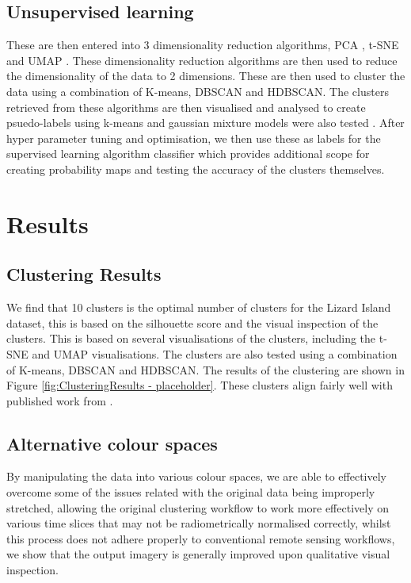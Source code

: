 \documentclass[journal,article,submit,pdftex,moreauthors]{Definitions/mdpi}
\begin{document}
\subsection*{Unsupervised learning}
These are then entered into 3 dimensionality reduction algorithms, PCA \cite{pearson1901}, t-SNE \cite{van2008visualizing} and UMAP \cite{mcinnes2018umap}. These dimensionality reduction algorithms are then used to reduce the dimensionality of the data to 2 dimensions. These are then used to cluster the data using a combination of K-means, DBSCAN and HDBSCAN. The clusters retrieved from these algorithms 
are then visualised and analysed to create psuedo-labels using k-means \cite{macqueen1967some} and gaussian mixture models were also tested \cite{rasmussen1999infinite}. After hyper parameter tuning and optimisation, we then use these as labels for the supervised learning algorithm classifier which provides
additional scope for creating probability maps and testing the accuracy of the clusters themselves. 





\section{Results}

\subsection*{Clustering Results}
We find that 10 clusters is the optimal number of clusters for the Lizard Island dataset, this is based on the silhouette score and the visual inspection of the clusters. This is based on several visualisations of the clusters, including the t-SNE and UMAP visualisations. 
The clusters are also tested using a combination of K-means, DBSCAN and HDBSCAN. The results of the clustering are shown in Figure \ref{fig:ClusteringResults - placeholder}. These clusters align fairly well with published work from \citep{Kennedy2021}. 

\subsection*{Alternative colour spaces}
By manipulating the data into various colour spaces, we are able to effectively overcome some of the issues related with the original data being improperly stretched, allowing the original clustering workflow to work more effectively on various time slices that may not be radiometrically
normalised correctly, whilst this process does not adhere properly to conventional remote sensing workflows, we show that the output imagery is generally improved upon qualitative visual inspection. 
\end{document}
